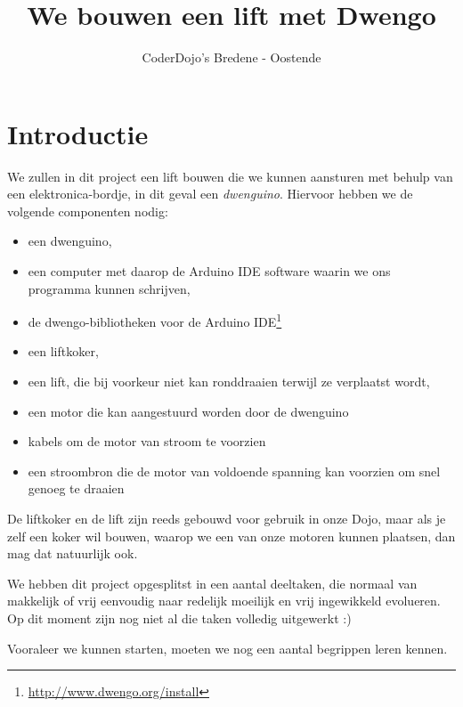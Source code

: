 \documentclass[a4paper, 10pt]{article}
\begin{document}
\title{We bouwen een lift met Dwengo}
\author{CoderDojo's Bredene - Oostende}
\maketitle

\section{Introductie}

We zullen in dit project een lift bouwen die we kunnen aansturen met behulp van een elektronica-bordje, in dit
geval een {\em dwenguino}. Hiervoor hebben we de volgende componenten nodig:

\begin{itemize}
\item een dwenguino,
\item een computer met daarop de Arduino IDE software waarin we ons programma kunnen schrijven,
\item de dwengo-bibliotheken voor de Arduino IDE\footnote{\url{http://www.dwengo.org/install}}
\item een liftkoker,
\item een lift, die bij voorkeur niet kan ronddraaien terwijl ze verplaatst wordt,
\item een motor die kan aangestuurd worden door de dwenguino
\item kabels om de motor van stroom te voorzien
\item een stroombron die de motor van voldoende spanning kan voorzien om snel genoeg te draaien
\end{itemize}

De liftkoker en de lift zijn reeds gebouwd voor gebruik in onze Dojo, maar als je zelf een koker wil bouwen, waarop
we een van onze motoren kunnen plaatsen, dan mag dat natuurlijk ook.

We hebben dit project opgesplitst in een aantal deeltaken, die normaal van makkelijk of vrij eenvoudig naar redelijk
moeilijk en vrij ingewikkeld evolueren. Op dit moment zijn nog niet al die taken volledig uitgewerkt :)

Vooraleer we kunnen starten, moeten we nog een aantal begrippen leren kennen.
\end{document}
